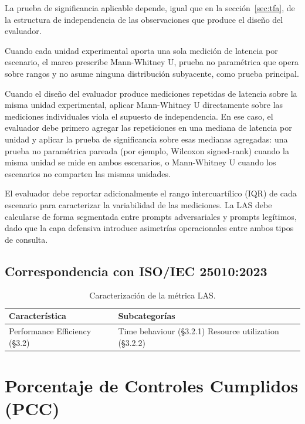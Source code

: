 La prueba de significancia aplicable depende, igual que en la
sección~\ref{sec:tfa}, de la estructura de independencia de las
observaciones que produce el diseño del evaluador.

Cuando cada unidad experimental aporta una sola medición de latencia
por escenario, el marco prescribe Mann-Whitney U, prueba no paramétrica
que opera sobre rangos y no asume ninguna distribución subyacente,
como prueba principal.

Cuando el diseño del evaluador produce mediciones repetidas de latencia
sobre la misma unidad experimental, aplicar Mann-Whitney U directamente
sobre las mediciones individuales viola el supuesto de independencia.
En ese caso, el evaluador debe primero agregar las repeticiones en una
mediana de latencia por unidad y aplicar la prueba de significancia
sobre esas medianas agregadas: una prueba no paramétrica pareada (por
ejemplo, Wilcoxon signed-rank) cuando la misma unidad se mide en ambos
escenarios, o Mann-Whitney U cuando los escenarios no comparten las
mismas unidades.

El evaluador debe reportar adicionalmente el rango intercuartílico (IQR)
de cada escenario para caracterizar la variabilidad de las mediciones.
La LAS debe calcularse de forma segmentada entre prompts adversariales
y prompts legítimos, dado que la capa defensiva introduce asimetrías
operacionales entre ambos tipos de consulta.


\subsection{Correspondencia con ISO/IEC 25010:2023}

\begin{table}[H]
  \centering
  \caption{Caracterización de la métrica LAS.}
  \label{tab:caract-las}
  \renewcommand{\arraystretch}{1.4}
  \begin{tabular}{
    >{\raggedright\arraybackslash}m{4cm}
    >{\raggedright\arraybackslash}m{7.5cm}
  }
  \toprule
  \textbf{Característica} & \textbf{Subcategorías} \\
  \midrule
  Performance Efficiency (\S3.2) &
    Time behaviour (\S3.2.1) \newline
    Resource utilization (\S3.2.2) \\
  \bottomrule
  \end{tabular}
\end{table}

\section{Porcentaje de Controles Cumplidos (PCC)}
\label{sec:pcc}

